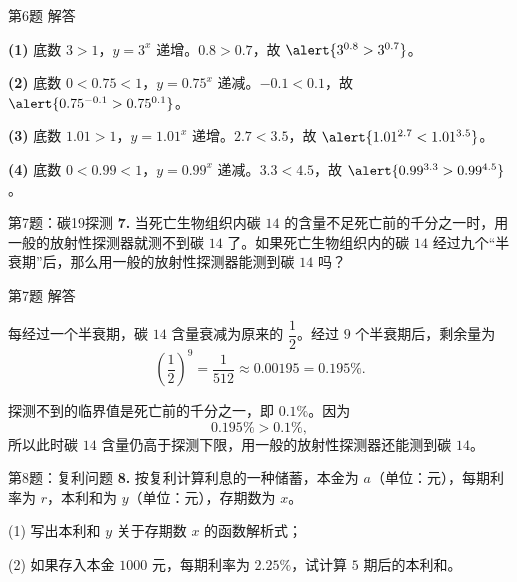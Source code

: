 \documentclass[10pt,aspectratio=169,serif,fleqn]{beamer}
\begin{document}
\begin{frame}[t]{第6题 解答}
\begin{tcolorbox}[colback=orange!10,colframe=orange,title=\textbf{解}]
\textbf{(1)} 底数 $3>1$，$y=3^{x}$ 递增。$0.8>0.7$，故 $\alert{3^{0.8}>3^{0.7}}$。

\vspace{0.4em}
\textbf{(2)} 底数 $0<0.75<1$，$y=0.75^{x}$ 递减。$-0.1<0.1$，故 $\alert{0.75^{-0.1}>0.75^{0.1}}$。

\vspace{0.4em}
\textbf{(3)} 底数 $1.01>1$，$y=1.01^{x}$ 递增。$2.7<3.5$，故 $\alert{1.01^{2.7}<1.01^{3.5}}$。

\vspace{0.4em}
\textbf{(4)} 底数 $0<0.99<1$，$y=0.99^{x}$ 递减。$3.3<4.5$，故 $\alert{0.99^{3.3}>0.99^{4.5}}$。
\end{tcolorbox}
\end{frame}

\begin{frame}[t]{第7题：碳19探测}
\textbf{7.} 当死亡生物组织内碳 $14$ 的含量不足死亡前的千分之一时，用一般的放射性探测器就测不到碳 $14$ 了。如果死亡生物组织内的碳 $14$ 经过九个“半衰期”后，那么用一般的放射性探测器能测到碳 $14$ 吗？
\end{frame}

\begin{frame}[t]{第7题 解答}
\begin{tcolorbox}[colback=orange!10,colframe=orange,title=\textbf{解}]
每经过一个半衰期，碳 $14$ 含量衰减为原来的 $\dfrac{1}{2}$。经过 $9$ 个半衰期后，剩余量为
\[
\left(\frac{1}{2}\right)^{9}=\frac{1}{512}\approx 0.00195=0.195\%.
\]

\vspace{0.5em}
探测不到的临界值是死亡前的千分之一，即 $0.1\%$。因为
\[
0.195\% > 0.1\%,
\]
所以此时碳 $14$ 含量\alert{仍高于}探测下限，用一般的放射性探测器\alert{还能测到}碳 $14$。
\end{tcolorbox}
\end{frame}

\begin{frame}[t]{第8题：复利问题}
\textbf{8.} 按复利计算利息的一种储蓄，本金为 $a$（单位：元），每期利率为 $r$，本利和为 $y$（单位：元），存期数为 $x$。

(1) 写出本利和 $y$ 关于存期数 $x$ 的函数解析式；

(2) 如果存入本金 $1000$ 元，每期利率为 $2.25\%$，试计算 $5$ 期后的本利和。
\end{frame}
\end{document}
